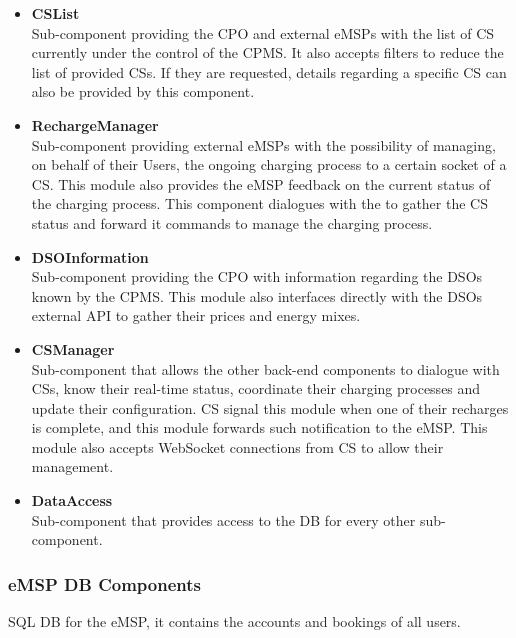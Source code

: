 \documentclass[11pt]{article}
\begin{document}
\begin{itemize}
    \item \textbf{CSList} \\
        Sub-component providing the CPO and external eMSPs with the list of CS currently under the control of the CPMS. It also accepts filters to reduce the list of provided CSs. If they are requested, details regarding a specific CS can also be provided by this component.
    \item \textbf{RechargeManager} \\
        Sub-component providing external eMSPs with the possibility of managing, on behalf of their Users, the ongoing charging process to a certain socket of a CS. This module also provides the eMSP feedback on the current status of the charging process. This component dialogues with the  to gather the CS status and forward it commands to manage the charging process.  
    \item \textbf{DSOInformation} \\
        Sub-component providing the CPO with information regarding the DSOs known by the CPMS. This module also interfaces directly with the DSOs external API to gather their prices and energy mixes. 
    \item \textbf{CSManager} \\
        Sub-component that allows the other back-end components to dialogue with CSs, know their real-time status, coordinate their charging processes and update their configuration. CS signal this module when one of their recharges is complete, and this module forwards such notification to the eMSP. This module also accepts WebSocket connections from CS to allow their management.
    \item \textbf{DataAccess} \\
        Sub-component that provides access to the DB for every other sub-component.
\end{itemize}

\newpage

\subsubsection{eMSP DB Components}

SQL DB for the eMSP, it contains the accounts and bookings of all users.
\end{document}
